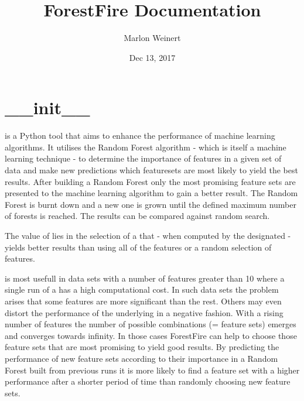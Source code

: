 \documentclass[letterpaper,10pt,english]{sphinxmanual}
\title{ForestFire Documentation}
\date{Dec 13, 2017}
\author{Marlon Weinert}
\begin{document}
\maketitle
\sphinxtableofcontents
{}\label{\detokenize{index::doc}}



\chapter{\_\_init\_\_}
\label{\detokenize{index:init}}\label{\detokenize{index:module-ForestFire}}\label{\detokenize{index:forestfire}}
 is a Python tool that aims to enhance the performance of machine learning algorithms. 
It utilises the Random Forest algorithm - which is itself a machine learning technique - to determine the 
importance of features in a given set of data and make new predictions which featuresets are most 
likely to yield the best results. 
After building a Random Forest only the most promising feature sets are presented to the machine learning algorithm to gain a better result. 
The Random Forest is burnt down and a new one is grown until the defined maximum number of forests is reached.
The results can be compared against random search.

The value of  lies in the selection of a {\hyperref[\detokenize{Overview:term-feature-set}]{}} that - when computed by the designated {\hyperref[\detokenize{Overview:mla}]{}} - yields
better results than using all of the features or a random selection of features.

 is most usefull in data sets with a number of features greater than 10 where a single run of
a {\hyperref[\detokenize{Overview:mla}]{}} has a high computational cost. In such data sets the problem arises that some features are
more significant than the rest.
Others may even distort the performance of the underlying {\hyperref[\detokenize{Overview:mla}]{}} in a negative fashion. 
With a rising number of features the number of possible combinations (= feature sets) emerges and converges towards infinity.
In those cases ForestFire can help to choose those feature sets that are most promising to yield good results.
By predicting the performance of new feature sets according to their importance in a Random Forest built 
from previous runs it is more likely to find a feature set with a higher performance after a shorter period 
of time than randomly choosing new feature sets.
\end{document}

